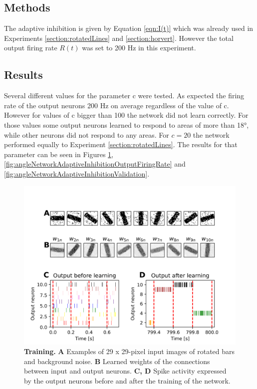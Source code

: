 \subsection{Methods}

The adaptive inhibition is given by Equation \ref{eqn:I(t)} which was already used in Experiments \ref{section:rotatedLines} and \ref{section:horvert}. However the total output firing rate $R(t)$ was set to 200 Hz in this experiment.

\subsection{Results}

Several different values for the parameter c were tested. As expected the firing rate of the output neurons 200 Hz on average regardless of the value of c. However for values of c bigger than 100 the network did not learn correctly. For those values some output neurons learned to respond to areas of more than 18°, while other neurons did not respond to any areas. For $c = 20$ the network performed equally to Experiment \ref{section:rotatedLines}. The results for that parameter can be seen in Figures \ref{fig:angleNetworkAdaptiveInhibitionTraining}, \ref{fig:angleNetworkAdaptiveInhibitionOutputFiringRate} and \ref{fig:angleNetworkAdaptiveInhibitionValidation}.


\begin{figure}
  \includegraphics[width=\linewidth]{figures/angleAdaptiveInh/trainingPlot.png}
  \caption{\textbf{Training.} \textbf{A} Examples of 29 x 29-pixel input images of rotated bars and background noise. \textbf{B} Learned weights of the connections between input and output neurons. \textbf{C, D} Spike activity expressed by the output neurons before and after the training of the network. }
  \label{fig:angleNetworkAdaptiveInhibitionTraining}
\end{figure}

